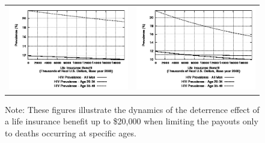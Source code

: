 \documentclass[12pt]{article}
\begin{document}
\begin{figure}
\begin{center}
\begin{tabular}{cc}
\includegraphics[scale=0.44]{images/hivB001.png} & \includegraphics[scale=0.44]{images/hivB010.png} \\
\end{tabular}
\parbox{6.5in}{\footnotesize{Note: These figures illustrate the dynamics of the deterrence effect of a life insurance benefit up to \$20,000 when limiting the payouts only to deaths occurring at specific ages.}}
\end{center}
\end{figure}
\end{document}

